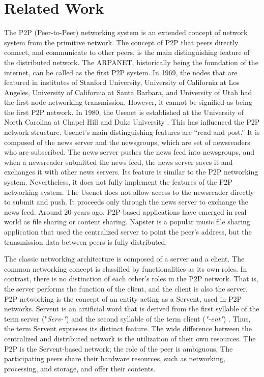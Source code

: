 \chapter{Related Work}
\label{cha:relatedwork}

The P2P (Peer-to-Peer) networking system is an extended concept of network system from the primitive network. The concept of P2P that peers directly connect, and communicate to other peers, is the main distinguishing feature of the distributed network. The ARPANET, historically being the foundation of the internet, can be called as the first P2P system. In 1969, the nodes that are featured in institutes of Stanford University, University of California at Los Angeles, University of California at Santa Barbara, and University of Utah had the first node networking transmission. However, it cannot be signified as being the first P2P network. In 1980, the Usenet is established at the University of North Carolina at Chapel Hill and Duke University \cite{lueg2012usenet}. This has influenced the P2P network structure. Usenet's main distinguishing features are “read and post.” It is composed of the news server and the newsgroups, which are set of newsreaders who are subscribed. The news server pushes the news feed into newsgroups, and when a newsreader submitted the news feed, the news server saves it and exchanges it with other news servers. Its feature is similar to the P2P networking system. Nevertheless, it does not fully implement the features of the P2P networking system. The Usenet does not allow access to the newsreader directly to submit and push. It proceeds only through the news server to exchange the news feed. Around 20 years ago, P2P-based applications have emerged in real world as file sharing or content sharing. Napster is a popular music file sharing application that used the centralized server to point the peer's address, but the transmission data between peers is fully distributed. 

The classic networking architecture is composed of a server and a client. The common networking concept is classified by functionalities as its own roles. In contrast, there is no distinction of each other's roles in the P2P network. That is, the server performs the function of the client, and the client is also the server. P2P networking is the concept of an entity acting as a Servent, used in P2P networks. Servent is an artificial word that is derived from the first syllable of the term server ("\textit{Serv-"}) and the second syllable of the term client (\textit{"-ent"}) \cite{schollmeier2001definition}. Thus, the term Servent expresses its distinct feature. The wide difference between the centralized and distributed network is the utilization of their own resources. The P2P is the Servent-based network; the role of the peer is ambiguous. The participating peers share their hardware resources, such as networking, processing, and storage, and offer their contents.

